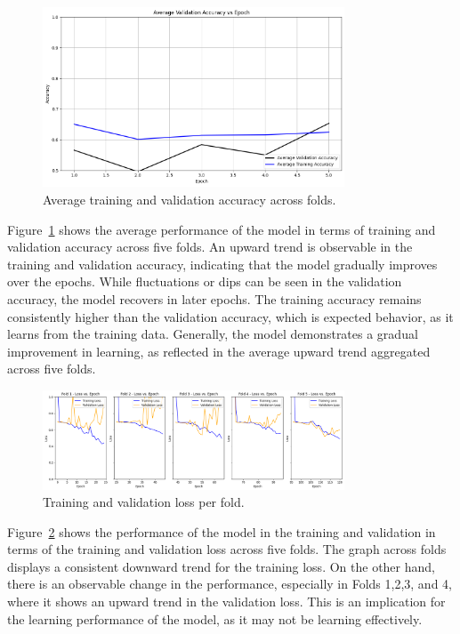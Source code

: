 \begin{figure}[!htbp]
	\centering
	\includegraphics[width=0.8\textwidth]{figures/avg_acc.png}
	\caption{Average training and validation accuracy across folds.}
	\label{fig:atvaaf}
\end{figure}

Figure~\ref{fig:atvaaf} shows the average performance of the model in terms of training and validation accuracy across five folds. An upward trend is observable in the training and validation accuracy, indicating that the model gradually improves over the epochs. While fluctuations or dips can be seen in the validation accuracy, the model recovers in later epochs. The training accuracy remains consistently higher than the validation accuracy, which is expected behavior, as it learns from the training data. Generally, the model demonstrates a gradual improvement in learning, as reflected in the average upward trend aggregated across five folds.

\begin{figure}[!htbp]
	\centering
	\includegraphics[width=0.8\textwidth]{figures/loss_epoch.png}
	\caption{Training and validation loss per fold.}
	\label{fig:tvlpf}
\end{figure}

Figure~\ref{fig:tvlpf} shows the performance of the model in the training and validation in terms of the training and validation loss across five folds. The graph across folds displays a consistent downward trend for the training loss. On the other hand, there is an observable change in the performance, especially in Folds 1,2,3, and 4, where it shows an upward trend in the validation loss. This is an implication for the learning performance of the model, as it may not be learning effectively. 


